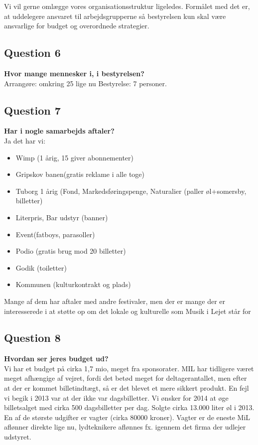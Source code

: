 Vi vil gerne omlægge vores organisationsstruktur ligeledes. Formålet med det er, at uddelegere ansvaret til arbejdsgrupperne så bestyrelsen kun skal være ansvarlige for budget og overordnede strategier. 

\subsection{Question 6}
\label{i1q6}
\noindent \textbf{Hvor mange mennesker i, i bestyrelsen?} \\
Arrangøre: omkring 25 lige nu
Bestyrelse: 7 personer.

\subsection{Question 7}
\label{i1q7}
\noindent \textbf{Har i nogle samarbejds aftaler?} \\
Ja det har vi: 
\begin{itemize}
	\item Wimp (1 årig, 15 giver abonnementer)
	\item Gripskov banen(gratis reklame i alle toge)
	\item Tuborg 1 årig (Fond, Markedsføringspenge, Naturalier (paller øl+somersby, billetter)
	\item Literpris, Bar udstyr (banner)
	\item Event(fatboys, parasoller)
	\item Podio (gratis brug mod 20 billetter)
	\item Godik (toiletter)
	\item Kommunen (kulturkontrakt og plads)
\end{itemize}
Mange af dem har aftaler med andre festivaler, men der er mange der er interesserede i at støtte op om det lokale og kulturelle som Musik i Lejet står for

\subsection{Question 8}
\label{i1q8}
\noindent \textbf{Hvordan ser jeres budget ud?} \\
Vi har et budget på cirka 1,7 mio, meget fra sponsorater. MIL har tidligere været meget afhængige af vejret, fordi det betød meget for deltagerantallet, men efter at der er kommet billetindtægt, så er det blevet et mere sikkert produkt. En fejl vi begik i 2013 var at der ikke var dagsbilletter. Vi ønsker for 2014 at øge billetsalget med cirka 500 dagsbilletter per dag. Solgte cirka 13.000 liter øl i 2013. En af de største udgifter er vagter (cirka 80000 kroner). Vagter er de eneste MiL aflønner direkte lige nu, lydteknikere aflønnes fx. igennem det firma der udlejer udstyret.


